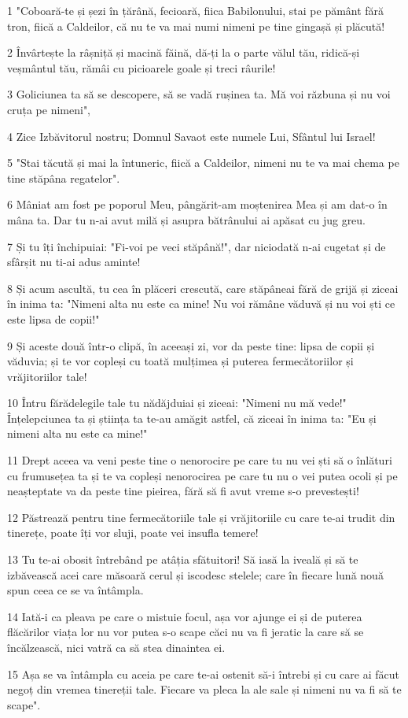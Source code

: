 \par 1 "Coboară-te și șezi în țărână, fecioară, fiica Babilonului, stai pe pământ fără tron, fiică a Caldeilor, că nu te va mai numi nimeni pe tine gingașă și plăcută!
\par 2 Învârtește la râșniță și macină făină, dă-ți la o parte vălul tău, ridică-și veșmântul tău, rămâi cu picioarele goale și treci râurile!
\par 3 Goliciunea ta să se descopere, să se vadă rușinea ta. Mă voi răzbuna și nu voi cruța pe nimeni",
\par 4 Zice Izbăvitorul nostru; Domnul Savaot este numele Lui, Sfântul lui Israel!
\par 5 "Stai tăcută și mai la întuneric, fiică a Caldeilor, nimeni nu te va mai chema pe tine stăpâna regatelor".
\par 6 Mâniat am fost pe poporul Meu, pângărit-am moștenirea Mea și am dat-o în mâna ta. Dar tu n-ai avut milă și asupra bătrânului ai apăsat cu jug greu.
\par 7 Și tu îți închipuiai: "Fi-voi pe veci stăpână!", dar niciodată n-ai cugetat și de sfârșit nu ti-ai adus aminte!
\par 8 Și acum ascultă, tu cea în plăceri crescută, care stăpâneai fără de grijă și ziceai în inima ta: "Nimeni alta nu este ca mine! Nu voi rămâne văduvă și nu voi ști ce este lipsa de copii!"
\par 9 Și aceste două într-o clipă, în aceeași zi, vor da peste tine: lipsa de copii și văduvia; și te vor copleși cu toată mulțimea și puterea fermecătoriilor și vrăjitoriilor tale!
\par 10 Întru fărădelegile tale tu nădăjduiai și ziceai: "Nimeni nu mă vede!" Înțelepciunea ta și știința ta te-au amăgit astfel, că ziceai în inima ta: "Eu și nimeni alta nu este ca mine!"
\par 11 Drept aceea va veni peste tine o nenorocire pe care tu nu vei ști să o înlături cu frumusețea ta și te va copleși nenorocirea pe care tu nu o vei putea ocoli și pe neașteptate va da peste tine pieirea, fără să fi avut vreme s-o prevestești!
\par 12 Păstrează pentru tine fermecătoriile tale și vrăjitoriile cu care te-ai trudit din tinerețe, poate îți vor sluji, poate vei insufla temere!
\par 13 Tu te-ai obosit întrebând pe atâția sfătuitori! Să iasă la iveală și să te izbăvească acei care măsoară cerul și iscodesc stelele; care în fiecare lună nouă spun ceea ce se va întâmpla.
\par 14 Iată-i ca pleava pe care o mistuie focul, așa vor ajunge ei și de puterea flăcărilor viața lor nu vor putea s-o scape căci nu va fi jeratic la care să se încălzească, nici vatră ca să stea dinaintea ei.
\par 15 Așa se va întâmpla cu aceia pe care te-ai ostenit să-i întrebi și cu care ai făcut negoț din vremea tinereții tale. Fiecare va pleca la ale sale și nimeni nu va fi să te scape".

